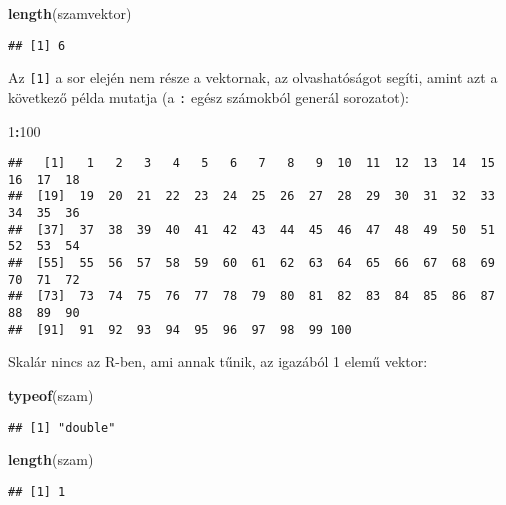 \documentclass[
]{book}
\newenvironment{Shaded}{\begin{snugshade}}{\end{snugshade}}
\newcommand{\DecValTok}[1]{\textcolor[rgb]{0.00,0.00,0.81}{#1}}
\newcommand{\KeywordTok}[1]{\textcolor[rgb]{0.13,0.29,0.53}{\textbf{#1}}}
\newcommand{\NormalTok}[1]{#1}
\newcommand{\OperatorTok}[1]{\textcolor[rgb]{0.81,0.36,0.00}{\textbf{#1}}}
\begin{document}
\begin{Shaded}
\begin{Highlighting}[]
\KeywordTok{length}\NormalTok{(szamvektor)}
\end{Highlighting}
\end{Shaded}

\begin{verbatim}
## [1] 6
\end{verbatim}

Az \texttt{{[}1{]}} a sor elején nem része a vektornak, az olvashatóságot segíti, amint azt a következő példa mutatja (a \texttt{:} egész számokból generál sorozatot):

\begin{Shaded}
\begin{Highlighting}[]
\DecValTok{1}\OperatorTok{:}\DecValTok{100}
\end{Highlighting}
\end{Shaded}

\begin{verbatim}
##   [1]   1   2   3   4   5   6   7   8   9  10  11  12  13  14  15  16  17  18
##  [19]  19  20  21  22  23  24  25  26  27  28  29  30  31  32  33  34  35  36
##  [37]  37  38  39  40  41  42  43  44  45  46  47  48  49  50  51  52  53  54
##  [55]  55  56  57  58  59  60  61  62  63  64  65  66  67  68  69  70  71  72
##  [73]  73  74  75  76  77  78  79  80  81  82  83  84  85  86  87  88  89  90
##  [91]  91  92  93  94  95  96  97  98  99 100
\end{verbatim}

Skalár nincs az R-ben, ami annak tűnik, az igazából 1 elemű vektor:

\begin{Shaded}
\begin{Highlighting}[]
\KeywordTok{typeof}\NormalTok{(szam)}
\end{Highlighting}
\end{Shaded}

\begin{verbatim}
## [1] "double"
\end{verbatim}

\begin{Shaded}
\begin{Highlighting}[]
\KeywordTok{length}\NormalTok{(szam)}
\end{Highlighting}
\end{Shaded}

\begin{verbatim}
## [1] 1
\end{verbatim}
\end{document}
